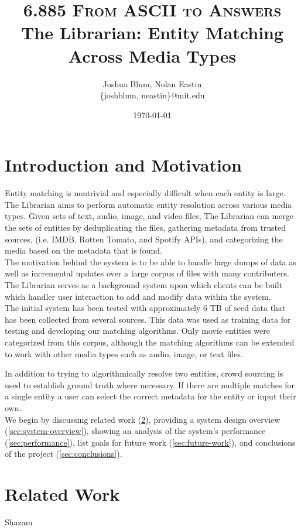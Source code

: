 \documentclass[paper=a4, fontsize=11pt]{scrartcl} %
\title{ 
\normalfont \normalsize 
\textsc{6.885 From ASCII to Answers} %
\horrule{0.5pt} %
\large The Librarian: Entity Matching Across Media Types %
\horrule{1pt} %
}
\author{Joshua Blum, Nolan Eastin \\ \{joshblum, neastin\}@mit.edu}
\date{\normalsize\today} %
\numberwithin{equation}{section} %
\numberwithin{figure}{section} %
\numberwithin{table}{section} %
\begin{document}
\maketitle %

\section{Introduction and Motivation}
Entity matching is nontrivial and especially difficult when each entity is large. The Librarian aims to perform automatic entity resolution across various media types. Given sets of text, audio, image, and video files, The Librarian can merge the sets of entities by deduplicating the files, gathering metadata from trusted sources, (i.e. IMDB, Rotten Tomato, and Spotify APIs), and categorizing the media based on the metadata that is found. \\

The motivation behind the system is to be able to handle large dumps of data as well as incremental updates over a large corpus of files with many contributers. The Librarian serves as a background system upon which clients can be built which handler user interaction to add and modify data within the system.\\

The initial system has been tested with approximately 6 TB of seed data that has been collected from several sources. This data was used as training data for testing and developing our matching algorithms. Only movie entities were categorized from this corpus, although the matching algorithms can be extended to work with other media types such as audio, image, or text files.

In addition to trying to algorithmically resolve two entities, crowd sourcing is used to establish ground truth where necessary. If there are multiple matches for a single entity a user can select the correct metadata for the entity or input their own.\\

We begin by discussing related work (\ref{sec:related-work}), providing a system design overview (\ref{sec:system-overview}), showing an analysis of the system's performance (\ref{sec:performance}), list goals for future work (\ref{sec:future-work}), and conclusions of the project (\ref{sec:conclusions}).

\section{Related Work}
\label{sec:related-work}
Shazam
\end{document}
